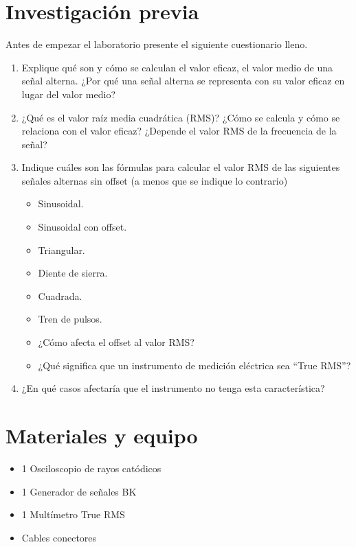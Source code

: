 \documentclass[12pt,letterpaper]{report}
\newcommand{\inv}{Investigación previa}
\newcommand{\mat}{Materiales y equipo}
\newcommand{\antesde}{Antes de empezar el laboratorio presente el siguiente cuestionario lleno.}
\begin{document}
\section{\inv}
\antesde
\begin{enumerate}
\item Explique qué son y cómo se calculan el valor eficaz, el valor medio de una
señal alterna. ¿Por qué una señal alterna se representa con su valor eficaz
en lugar del valor medio?
\item ¿Qué es el valor raíz media cuadrática (RMS)? ¿Cómo se calcula y cómo se
relaciona con el valor eficaz? ¿Depende el valor RMS de la frecuencia de la
señal?
\item Indique cuáles son las fórmulas para calcular el valor RMS de las siguientes
señales alternas sin offset (a menos que se indique lo contrario)

\begin{itemize}
\item Sinusoidal.
\item Sinusoidal con offset.
\item Triangular.
\item Diente de sierra.
\item Cuadrada.
\item Tren de pulsos.
\item ¿Cómo afecta el offset al valor RMS?
\item ¿Qué significa que un instrumento de medición eléctrica sea “True RMS”?
\end{itemize}

\item ¿En qué casos afectaría que el instrumento no tenga esta característica?
\end{enumerate}

\section{\mat}
\begin{itemize}
\item 1 Osciloscopio de rayos catódicos
\item 1 Generador de señales BK
\item 1 Multímetro True RMS
\item Cables conectores
\end{itemize}
\end{document}
